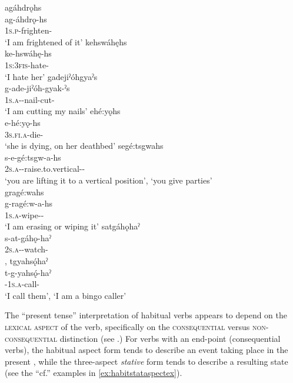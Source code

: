 \ea\label{ex:habitaspectex}
\ea agáhdrǫhs\\
\gll ag-áhdrǫ-hs\\
 \textsc{1s.p}-frighten-{\habitual}\\
\glt `I am frightened of it'
\ex kehswáhęhs\\
\gll ke-hswáhę-hs\\
 \textsc{1s:3fis}-hate-{\habitual}\\
\glt `I hate her'
\ex gadejiˀóhgyaˀs\\
\gll g-ade-jiˀóh-gyak-ˀs\\
 \textsc{1s.a}-{\semireflexive}-nail-cut-{\habitual}\\
\glt `I am cutting my nails'
\ex ehé:yǫhs\\
\gll e-hé:yǫ-hs\\
 \textsc{3s.fi.a}-die-{\habitual}\\
\glt `she is dying, on her deathbed'
\ex segé:tsgwahs \\
\gll s-e-gé:tsgw-a-hs\\
 \textsc{2s.a}-{\joinerE}-raise.to.vertical-{\joinerA}-{\habitual}\\
\glt ‘you are lifting it to a vertical position’, `you give parties'\\
\ex gragé:wahs\\
\gll g-ragé:w-a-hs\\
 \textsc{1s.a}-wipe-{\joinerA}-{\habitual}\\
\glt `I am erasing or wiping it'
\ex satgáhǫhaˀ\\
\gll s-at-gáhǫ-haˀ\\
 \textsc{2s.a}-{\semireflexive}-watch-{\habitual}\\
\glt {}, 
\ex tgyahsǫ́haˀ\\
\gll t-g-yahsǫ́-haˀ\\
 {\cislocative}-\textsc{1s.a}-call-{\habitual}\\
\glt  ‘I call them’, `I am a bingo caller'
\z
\z

The “present tense” interpretation of habitual verbs appears to depend on the \textsc{lexical aspect} of the verb, specifically on the \textsc{consequential} versus \textsc{non-consequential} distinction (see .) For verbs with an end-point (consequential verbs), the habitual aspect form tends to describe an event taking place in the present , while the three-aspect \emph{stative} form tends to describe a resulting state (see the “cf.” examples in \ref{ex:habitstataspectex}).


